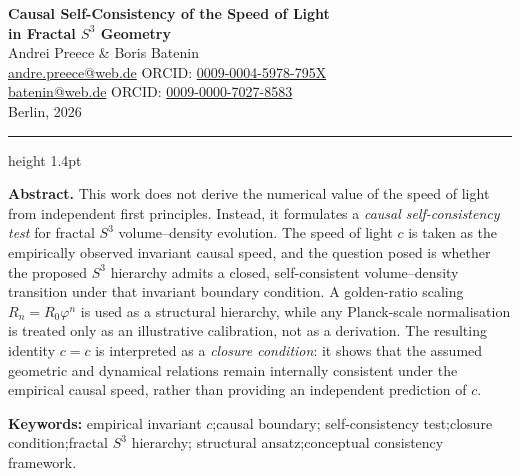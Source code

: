 \documentclass[11pt,a4paper]{article}
\newcommand{\ph}{\varphi}
\begin{document}
\thispagestyle{empty}

\begin{center}
  {\LARGE\bfseries\color{deepblue}
    Causal Self-Consistency of the Speed of Light\\[5pt]
    in Fractal $S^3$ Geometry}\\[18pt]
  {\large Andrei Preece \quad \& \quad Boris Batenin}\\[7pt]
  {\small
    \href{mailto:andre.preece@web.de}{andre.preece@web.de}\quad
    ORCID: \href{https://orcid.org/0009-0004-5978-795X}{0009-0004-5978-795X}\\[2pt]
    \href{mailto:batenin@web.de}{batenin@web.de}\quad
    ORCID: \href{https://orcid.org/0009-0000-7027-8583}{0009-0000-7027-8583}\\[7pt]
    Berlin, 2026
  }
\end{center}

\vspace{5pt}
{\color{midblue}\hrule height 1.4pt}
\vspace{14pt}

\begin{center}
\begin{minipage}{0.93\linewidth}
\textbf{Abstract.}\;
This work does not derive the numerical value of the speed of light from independent
first principles. Instead, it formulates a \emph{causal self-consistency test} for
fractal $S^3$ volume--density evolution. The speed of light $c$ is taken as the
empirically observed invariant causal speed, and the question posed is whether the
proposed $S^3$ hierarchy admits a closed, self-consistent volume--density transition
under that invariant boundary condition. A golden-ratio scaling $R_n = R_0\ph^n$ is
used as a structural hierarchy, while any Planck-scale normalisation is treated only
as an illustrative calibration, not as a derivation. The resulting identity $c = c$
is interpreted as a \emph{closure condition}: it shows that the assumed geometric and
dynamical relations remain internally consistent under the empirical causal speed,
rather than providing an independent prediction of $c$.

\smallskip
\noindent\textbf{Keywords:} empirical invariant $c$;\;causal boundary;\;
self-consistency test;\;closure condition;\;fractal $S^3$ hierarchy;\;
structural ansatz;\;conceptual consistency framework.
\end{minipage}
\end{center}
\end{document}
